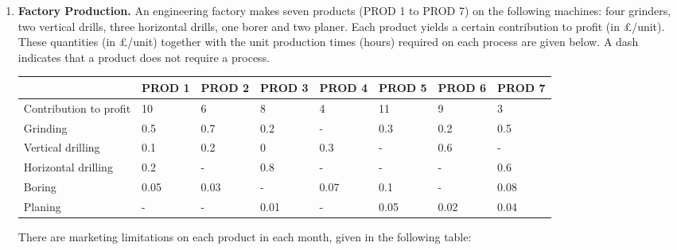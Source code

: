 \documentclass[12pt,a4paper]{article}
\theoremstyle{definition}
\begin{document}
\begin{enumerate}
    




    
    
    
    
    
    
    
	\item 
	\textbf{Factory Production. }An engineering factory makes seven products (PROD 1 to PROD 7) on the following machines: four grinders, two vertical drills, three horizontal drills, one borer and two planer. Each product yields a certain contribution to profit (in \pounds/unit). These quantities (in \pounds/unit) together with the unit production times (hours) required on each process are given below. A dash indicates that a product does not require a process.
	
	\begin{table}[htbp]
		\scriptsize
		\centering
		\renewcommand\arraystretch{1.1}
		\begin{tabular}{m{} m{}<{\centering} m{}<{\centering} m{}<{\centering} m{}<{\centering} m{}<{\centering} m{}<{\centering} m{}<{\centering}}
			\hline
			& \textbf{PROD 1} & \textbf{PROD 2} & \textbf{PROD 3} & \textbf{PROD 4} & \textbf{PROD 5} & \textbf{PROD 6} &  \textbf{PROD 7} \\\hline
			Contribution to profit & 10 & 6 & 8 & 4 & 11 & 9 & 3 \\
			Grinding & 0.5 & 0.7 & 0.2 & - & 0.3 & 0.2 & 0.5 \\
			Vertical drilling & 0.1 & 0.2 & 0 & 0.3 & - & 0.6 & - \\
			Horizontal drilling & 0.2 & - & 0.8 & - & - & - & 0.6 \\
			Boring & 0.05 & 0.03 & - & 0.07 & 0.1 & - & 0.08 \\
			Planing & - & - & 0.01 & - & 0.05 & 0.02 & 0.04 \\
			\hline
		\end{tabular}
	\end{table}
	
	There are marketing limitations on each product in each month, given in the following table:
	

\end{enumerate}
\end{document}
